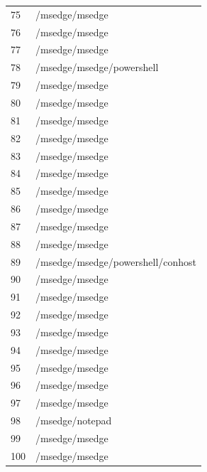 \documentclass[a4paper,twoside,12pt]{book}
\begin{document}
\begin{appendices}
\begin{table}
\begin{tabular}{ll}
		75  &                                     /msedge/msedge \\
		76  &                                     /msedge/msedge \\
		77  &                                     /msedge/msedge \\
		78  &                          /msedge/msedge/powershell \\
		79  &                                     /msedge/msedge \\
		80  &                                     /msedge/msedge \\
		81  &                                     /msedge/msedge \\
		82  &                                     /msedge/msedge \\
		83  &                                     /msedge/msedge \\
		84  &                                     /msedge/msedge \\
		85  &                                     /msedge/msedge \\
		86  &                                     /msedge/msedge \\
		87  &                                     /msedge/msedge \\
		88  &                                     /msedge/msedge \\
		89  &                  /msedge/msedge/powershell/conhost \\
		90  &                                     /msedge/msedge \\
		91  &                                     /msedge/msedge \\
		92  &                                     /msedge/msedge \\
		93  &                                     /msedge/msedge \\
		94  &                                     /msedge/msedge \\
		95  &                                     /msedge/msedge \\
		96  &                                     /msedge/msedge \\
		97  &                                     /msedge/msedge \\
		98  &                                    /msedge/notepad \\
		99  &                                     /msedge/msedge \\
		100 &                                     /msedge/msedge \\

\end{tabular}
\end{table}
\end{appendices}
\end{document}
